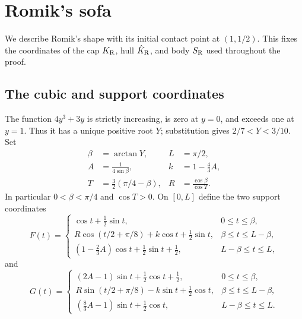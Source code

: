 \section{Romik's sofa}\label{app:romik}\label{sec:romik}

We describe Romik's shape \cite[Theorem~5]{Romik18} with its initial
contact point at $(1,1/2)$. This fixes the coordinates of the cap
$K_{\mathrm R}$, hull $\hat K_{\mathrm R}$, and body $S_{\mathrm R}$ used throughout the proof.

\subsection{The cubic and support coordinates}
The function $4y^3+3y$ is strictly increasing, is zero at $y=0$,
and exceeds one at $y=1$. Thus it has a unique positive root $Y$;
substitution gives $2/7<Y<3/10$. Set
\begin{equation}\label{eq:reference-parameters}
 \begin{aligned}
 \beta&=\arctan Y,&L&=\pi/2,\\
 A&=\frac1{4\sin\beta},&k&=1-\frac43A,\\
 T&=\frac32(\pi/4-\beta),&R&=\frac{\cos\beta}{\cos T}.
 \end{aligned}
\end{equation}
In particular $0<\beta<\pi/4$ and $\cos T>0$.
On $[0,L]$ define the two support coordinates
\begin{equation}\label{eq:reference-F}
 F(t)=\begin{cases}
 \cos t+\tfrac12\sin t,&0\le t\le\beta,\\
 R\cos(t/2+\pi/8)+k\cos t+\tfrac12\sin t,
       &\beta\le t\le L-\beta,\\
 (1-\tfrac23A)\cos t+\tfrac12\sin t+\tfrac12,
       &L-\beta\le t\le L,
 \end{cases}
\end{equation}
and
\begin{equation}\label{eq:reference-G}
 G(t)=\begin{cases}
 (2A-1)\sin t+\tfrac12\cos t+\tfrac12,&0\le t\le\beta,\\
 R\sin(t/2+\pi/8)-k\sin t+\tfrac12\cos t,
       &\beta\le t\le L-\beta,\\
 (\tfrac83A-1)\sin t+\tfrac12\cos t,
       &L-\beta\le t\le L.
 \end{cases}
\end{equation}

